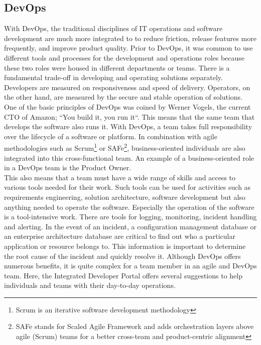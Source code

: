 \documentclass[a4paper,12pt]{article}
\begin{document}
    \subsection{DevOps}
    \label{subsec:devops}
    With DevOps, the traditional disciplines of IT operations and software development are much more integrated to
    to reduce friction, release features more frequently, and improve product quality\parencite{safedevops}.
    Prior to DevOps, it was common to use different tools and processes for the development and operations roles
    because these two roles were housed in different departments or teams.
    There is a fundamental trade-off in developing and operating solutions separately.
    Developers are measured on responsiveness and speed of delivery.
    Operators, on the other hand, are measured by the secure and stable operation of solutions.\\
    One of the basic principles of DevOps was coined by Werner Vogels, the current CTO of Amazon;
    ``You build it, you run it``\parencite{vogels}.
    This means that the same team that develops the software also runs it.
    With DevOps, a team takes full responsibility over the lifecycle of a software or platform.
    In combination with agile methodologies such as Scrum\footnote{Scrum is an iterative software development methodology}
    or SAFe\footnote{SAFe stands for Scaled Agile Framework and adds orchestration layers above agile (Scrum) teams for
    a better cross-team and product-centric alignment}, business-oriented individuals are also integrated into this
    cross-functional team.
    An example of a business-oriented role in a DevOps team is the Product Owner\parencite{safepo}.\\
    This also means that a team must have a wide range of skills and access to various tools needed for their work.
    Such tools can be used for activities such as requirements engineering, solution architecture, software development
    but also anything needed to operate the software.
    Especially the operation of the software is a tool-intensive work.
    There are tools for logging, monitoring, incident handling and alerting.
    In the event of an incident, a configuration management database or an enterprise architecture database are critical
    to find out who a particular application or resource belongs to.
    This information is important to determine the root cause of the incident and quickly resolve it.
    Although DevOps offers numerous benefits, it is quite complex for a team member in an agile and DevOps team.
    Here, the Integrated Developer Portal offers several suggestions to help individuals and teams with their day-to-day operations.
\end{document}

